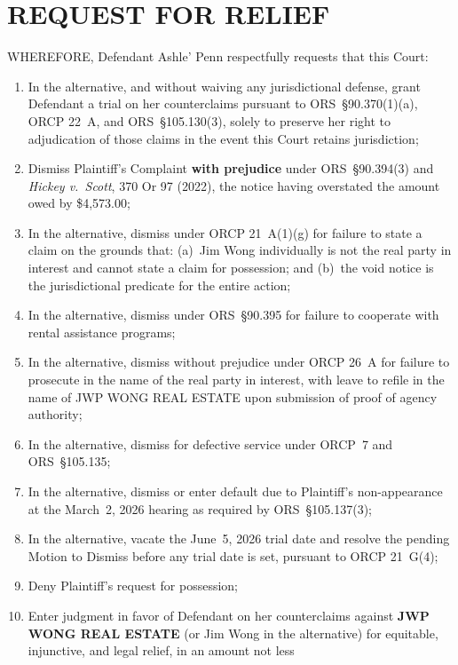 \documentclass[10pt,letterpaper,oneside]{extarticle}
\begin{document}
\section{\textbf{REQUEST FOR RELIEF}}
WHEREFORE, Defendant Ashle' Penn respectfully requests that
this Court:
\begin{enumerate}[label=\arabic*.,leftmargin=.5in,nosep]
	\item In the alternative, and without waiving any
	jurisdictional defense, grant Defendant a trial on her
	counterclaims pursuant to ORS~\S90.370(1)(a),
	ORCP 22~A, and ORS~\S105.130(3), solely to preserve
	her right to adjudication of those claims in the event
	this Court retains jurisdiction;
	\item Dismiss Plaintiff's Complaint \textbf{with
		prejudice} under ORS~\S90.394(3) and
	\textit{Hickey v.\ Scott}, 370 Or 97 (2022), the
	notice having overstated the amount owed by
	\$4,573.00;
	\item In the alternative, dismiss under
	ORCP 21~A(1)(g) for failure to state a claim on the
	grounds that: (a)~Jim Wong individually is not the
	real party in interest and cannot state a claim for
	possession; and (b)~the void notice is the
	jurisdictional predicate for the entire action;
	\item In the alternative, dismiss under
	ORS~\S90.395 for failure to cooperate with rental
	assistance programs;
	\item In the alternative, dismiss without prejudice
	under ORCP 26~A for failure to prosecute in the name
	of the real party in interest, with leave to refile
	in the name of JWP WONG REAL ESTATE upon submission
	of proof of agency authority;
	\item In the alternative, dismiss for defective
	service under ORCP~7 and ORS~\S105.135;
	\item In the alternative, dismiss or enter default
	due to Plaintiff's non-appearance at the March~2,
	2026 hearing as required by ORS~\S105.137(3);
	\item In the alternative, vacate the June~5, 2026
	trial date and resolve the pending Motion to Dismiss
	before any trial date is set, pursuant to
	ORCP 21~G(4);
	\item Deny Plaintiff's request for possession;
	\item Enter judgment in favor of Defendant on her
	counterclaims against \textbf{JWP WONG REAL ESTATE}
	(or Jim Wong in the alternative) for equitable,
	injunctive, and legal relief, in an amount not less

\end{enumerate}
\end{document}
